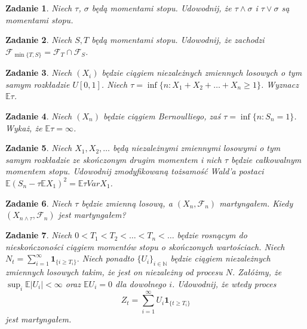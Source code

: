 \documentclass{mwart}
\newtheorem{zd}{Zadanie}
\begin{document}
\begin{zd}
Niech $\tau$, $\sigma$ będą momentami stopu. Udowodnij, że $\tau \land \sigma$ i $\tau \lor \sigma$ są momentami stopu.
\end{zd}


\begin{zd}
	Niech $S, T$ będą momentami stopu. Udowodnij, że zachodzi $\mathcal{F}_{\min\{T,S\}} = \mathcal{F}_{T} \cap \mathcal{F}_{S}$.
\end{zd}
\begin{zd}
Niech $(X_i)$ będzie ciągiem niezależnych zmiennych losowych o tym samym rozkładzie $U[0, 1]$. Niech $\tau = \inf\{n\colon X_1 + X_2 + \dots + X_n \geq 1\}$. Wyznacz $\mathbb{E}\tau$.
\end{zd}

\begin{zd}
Niech $(X_n)$ będzie ciągiem Bernoulliego, zaś $\tau = \inf\{n\colon S_n=1\}$. Wykaż, że $\mathbb{E}\tau = \infty$.
\end{zd}
\begin{zd}
Niech $X_1, X_2, \dots$ będą niezależnymi zmiennymi losowymi o tym samym rozkładzie ze skończonym drugim momentem i nich $\tau$ będzie całkowalnym momentem stopu. Udowodnij zmodyfikowaną tożsamość Wald'a postaci $\mathbb{E}\left(S_n - \tau\mathbb{E}X_1\right)^2 = \mathbb{E}\tau VarX_1$.
\end{zd}

\begin{zd}
Niech $\tau$ będzie zmienną losową, a $(X_n, \mathcal{F}_n)$ martyngałem. Kiedy $(X_{n\wedge \tau}, \mathcal{F}_n)$ jest martyngałem?
\end{zd}

\begin{zd}
	Niech $0 < T_1 < T_2 < \dots < T_n < \dots $ będzie rosnącym do nieskończoności ciągiem momentów stopu o skończonych wartościach. Niech $N_t = \sum_{i = 1}^{\infty}\pmb{1}_{\{i \geq T_i\}}.$ Niech ponadto $\{U_i\}_{i \in \mathbb{N}}$ będzie ciągiem niezależnych zmiennych losowych takim, że jest on niezależny od procesu $N$. Załóżmy, że $\sup_i\mathbb{E}|U_i|< \infty$ oraz $\mathbb{E}U_i = 0$ dla dowolnego $i$. Udowodnij, że wtedy proces
	\begin{displaymath}
		Z_t = \sum_{i = 1}^{\infty}U_i\pmb{1}_{\{t \geq T_i\}}
	\end{displaymath}
	jest martyngałem.
\end{zd}
\end{document}
